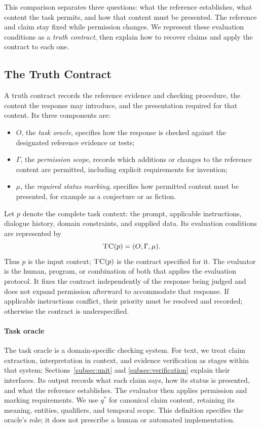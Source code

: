 \documentclass{clv2025}
\newcommand{\TC}{\textsc{TC}}
\begin{document}
This comparison separates three questions: what the reference establishes,
what content the task permits, and how that content must be presented.
The reference and claim stay fixed while permission changes. We represent
these evaluation conditions as a \emph{truth contract}, then explain how
to recover claims and apply the contract to each one.

\subsection{The Truth Contract}\label{subsec:contract}
A truth contract records the reference evidence and checking procedure,
the content the response may introduce, and the presentation required for
that content. Its three components are:
\begin{itemize}
\item $O$, the \emph{task oracle}, specifies how the response is checked
against the designated reference evidence or tests;
\item $\Gamma$, the \emph{permission scope}, records which additions or
changes to the reference content are permitted, including explicit
requirements for invention;
\item $\mu$, the \emph{required status marking}, specifies how permitted
content must be presented, for example as a conjecture or as fiction.
\end{itemize}
Let $p$ denote the complete task context: the prompt, applicable instructions,
dialogue history, domain constraints, and supplied data. Its evaluation
conditions are represented by
\begin{equation}
\TC(p)=(O,\Gamma,\mu).
\label{eq:truth-contract}
\end{equation}
Thus $p$ is the input context; $\TC(p)$ is the contract specified for it.
The evaluator is the human, program, or combination of both that applies
the evaluation protocol. It fixes the contract independently of the response
being judged and does not expand permission afterward to accommodate that
response. If applicable instructions conflict, their priority must be
resolved and recorded; otherwise the contract is underspecified.

\paragraph{Task oracle}
The task oracle is a domain-specific checking system. For text, we treat
claim extraction, interpretation in context, and evidence verification as
stages within that system; Sections~\ref{subsec:unit} and
\ref{subsec:verification} explain their interfaces. Its output records what
each claim says, how its status is presented, and what the reference
establishes. The evaluator then applies permission and marking requirements.
We use $q^*$ for canonical claim content, retaining its meaning, entities,
qualifiers, and temporal scope. This definition specifies the oracle's role;
it does not prescribe a human or automated implementation.
\end{document}
